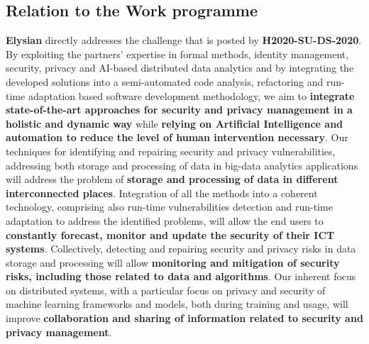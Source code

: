 \documentclass[a4paper,11pt]{article}
\newcommand{\project}[1]{\textbf{#1}\xspace}
\newcommand{\SECURITY}{\project{Elysian}}
\newcommand{\TheProject}{\SECURITY}
\begin{document}
\subsection{Relation to the Work programme}
\TheProject{} directly addresses the challenge that is posted by \textbf{H2020-SU-DS-2020}. By exploiting the partners' expertise in formal methods, identity management, security, privacy and AI-based distributed data analytics and by integrating the developed solutions into a semi-automated code analysis, refactoring and run-time adaptation based software development methodology, we aim to \textbf{integrate state-of-the-art approaches for security and privacy management in a holistic and dynamic way} while \textbf{relying on Artificial Intelligence and automation to reduce the level of human intervention necessary}. Our techniques for identifying and repairing security and privacy vulnerabilities, addressing both storage and processing of data in big-data analytics applications will address the problem of \textbf{storage and processing of data in different interconnected places}. Integration of all the methods into a coherent technology, comprising also run-time vulnerabilities detection and run-time adaptation to address the identified problems, will allow the end users to \textbf{constantly forecast, monitor and update the security of their ICT systems}. Collectively, detecting and repairing security and privacy risks in data storage and processing will allow \textbf{monitoring and mitigation of security risks, including those related to data and algorithms}. Our inherent focus on distributed systems, with a particular focus on privacy and security of machine learning frameworks and models, both during training and usage, will improve \textbf{collaboration and sharing of information related to security and privacy management}. 
\end{document}
